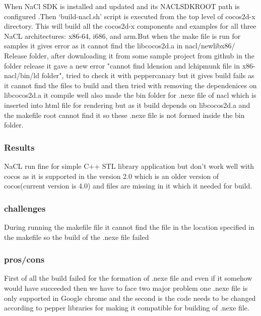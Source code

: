 \documentclass[23pt]{article}
\begin{document}
{\Large When NaCl SDK is installed and updated and its NACL\textunderscore SDK\textunderscore ROOT path is configured .Then ‘build-nacl.sh’ script is executed from the top level of cocos2d-x directory. This will build all the cocos2d-x components and examples for all three NaCL architectures: x86-64, i686, and arm.But when the make file is run for samples it gives error as it cannot find the libcocos2d.a in nacl/newlib\textunderscore x86/ Release folder, after downloading it from  some sample project from github in the folder release  it  gave a new  error "cannot find ldension  and lchipmunk file in  x86- nacl/bin/ld folder", tried to check it with pepper\textunderscore canary but it gives build fails as it cannot find the files to build and then tried with removing the dependenices on libcocos2d.a it compile well also made the bin folder for .nexe file of nacl which is inserted into html file for rendering but as it build depends on libcocos2d.a and the makefile root cannot find it so these .nexe file is not formed inside the bin folder. \cite{naclsetup} \par}

\subsubsection{Results}

{\Large NaCL run fine for simple C++ STL library application but don’t work well with cocos as it is supported in the version 2.0 which is an older version of cocos(current version is 4.0) and files are missing in it which it needed for build. \par}


\subsubsection{challenges}

{\Large During running the makefile file it cannot find the file in the location specified in the makefile so the build of the .nexe file failed \par}

\subsubsection{pros/cons}

{\Large First of all the build failed for the formation of .nexe file and even if it somehow would have succeeded then we have to face two major problem one .nexe file is only supported in Google chrome and the second is the code needs to be changed according to pepper libraries for making it compatible for building of .nexe file.}
\end{document}
